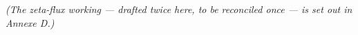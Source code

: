 \textit{(The zeta-flux working --- drafted twice here, to be reconciled once --- is set out in Annexe D.)}

